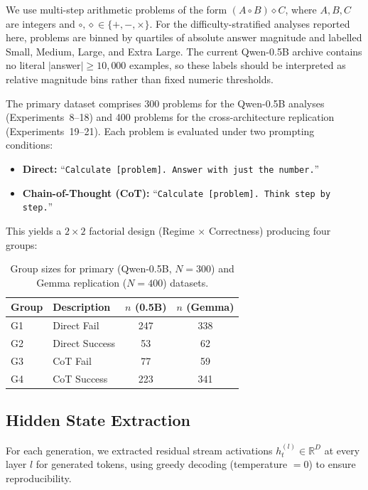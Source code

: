 \documentclass[11pt,twocolumn]{article}
\newcommand{\groupone}{\textsc{G1}}
\newcommand{\grouptwo}{\textsc{G2}}
\newcommand{\groupthree}{\textsc{G3}}
\newcommand{\groupfour}{\textsc{G4}}
\begin{document}
We use multi-step arithmetic problems of the form $(A \circ B) \diamond C$, where $A, B, C$ are integers and $\circ, \diamond \in \{+, -, \times\}$. For the difficulty-stratified analyses reported here, problems are binned by quartiles of absolute answer magnitude and labelled Small, Medium, Large, and Extra Large. The current Qwen-0.5B archive contains no literal $|$answer$| \geq 10{,}000$ examples, so these labels should be interpreted as relative magnitude bins rather than fixed numeric thresholds.

The primary dataset comprises 300 problems for the Qwen-0.5B analyses (Experiments~8--18) and 400 problems for the cross-architecture replication (Experiments~19--21). Each problem is evaluated under two prompting conditions:

\begin{itemize}[nosep, leftmargin=*]
    \item \textbf{Direct:} ``\texttt{Calculate [problem]. Answer with just the number.}''
    \item \textbf{Chain-of-Thought (CoT):} ``\texttt{Calculate [problem]. Think step by step.}''
\end{itemize}

This yields a $2 \times 2$ factorial design (Regime $\times$ Correctness) producing four groups:

\begin{table}[h]
\centering
\small
\begin{tabular}{llcc}
\toprule
\textbf{Group} & \textbf{Description} & \textbf{$n$ (0.5B)} & \textbf{$n$ (Gemma)} \\
\midrule
\groupone{} & Direct Fail & 247 & 338 \\
\grouptwo{} & Direct Success & 53 & 62 \\
\groupthree{} & CoT Fail & 77 & 59 \\
\groupfour{} & CoT Success & 223 & 341 \\
\bottomrule
\end{tabular}
\caption{Group sizes for primary (Qwen-0.5B, $N = 300$) and Gemma replication ($N = 400$) datasets.}
\label{tab:groups}
\end{table}

\subsection{Hidden State Extraction}

For each generation, we extracted residual stream activations $h_t^{(l)} \in \mathbb{R}^D$ at every layer $l$ for generated tokens, using greedy decoding (temperature $= 0$) to ensure reproducibility.
\end{document}
